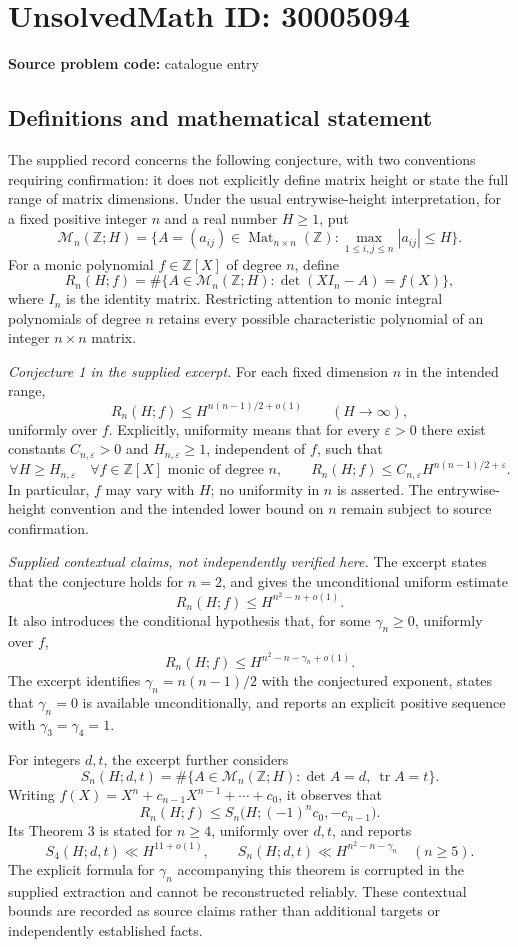 \documentclass[11pt]{article}
\newcommand{\Z}{\mathbb{Z}}
\begin{document}
\section*{UnsolvedMath ID: 30005094}
\textbf{Source problem code:} catalogue entry
\subsection{Definitions and mathematical statement}
The supplied record concerns the following conjecture, with two conventions requiring confirmation: it does not explicitly define matrix height or state the full range of matrix dimensions. Under the usual entrywise-height interpretation, for a fixed positive integer \(n\) and a real number \(H\geq 1\), put
\[
\mathcal M_n(\Z;H)=\{A=(a_{ij})\in\operatorname{Mat}_{n\times n}(\Z):\max_{1\leq i,j\leq n}|a_{ij}|\leq H\}.
\]
For a monic polynomial \(f\in\Z[X]\) of degree \(n\), define
\[
R_n(H;f)=\#\{A\in\mathcal M_n(\Z;H):\det(XI_n-A)=f(X)\},
\]
where \(I_n\) is the identity matrix. Restricting attention to monic integral polynomials of degree \(n\) retains every possible characteristic polynomial of an integer \(n\times n\) matrix.

\emph{Conjecture 1 in the supplied excerpt.} For each fixed dimension \(n\) in the intended range,
\[
R_n(H;f)\leq H^{n(n-1)/2+o(1)}\qquad(H\to\infty),
\]
uniformly over \(f\). Explicitly, uniformity means that for every \(\varepsilon>0\) there exist constants \(C_{n,\varepsilon}>0\) and \(H_{n,\varepsilon}\geq1\), independent of \(f\), such that
\[
\forall H\geq H_{n,\varepsilon}\quad
\forall f\in\Z[X]\text{ monic of degree }n,\qquad
R_n(H;f)\leq C_{n,\varepsilon}H^{n(n-1)/2+\varepsilon}.
\]
In particular, \(f\) may vary with \(H\); no uniformity in \(n\) is asserted. The entrywise-height convention and the intended lower bound on \(n\) remain subject to source confirmation.

\emph{Supplied contextual claims, not independently verified here.} The excerpt states that the conjecture holds for \(n=2\), and gives the unconditional uniform estimate
\[
R_n(H;f)\leq H^{n^2-n+o(1)}.
\]
It also introduces the conditional hypothesis that, for some \(\gamma_n\geq0\), uniformly over \(f\),
\[
R_n(H;f)\leq H^{n^2-n-\gamma_n+o(1)}.
\]
The excerpt identifies \(\gamma_n=n(n-1)/2\) with the conjectured exponent, states that \(\gamma_n=0\) is available unconditionally, and reports an explicit positive sequence with \(\gamma_3=\gamma_4=1\).

For integers \(d,t\), the excerpt further considers
\[
S_n(H;d,t)=\#\{A\in\mathcal M_n(\Z;H):\det A=d,\ \operatorname{tr}A=t\}.
\]
Writing \(f(X)=X^n+c_{n-1}X^{n-1}+\cdots+c_0\), it observes that
\[
R_n(H;f)\leq S_n\bigl(H;(-1)^nc_0,-c_{n-1}\bigr).
\]
Its Theorem 3 is stated for \(n\geq4\), uniformly over \(d,t\), and reports
\[
S_4(H;d,t)\ll H^{11+o(1)},\qquad
S_n(H;d,t)\ll H^{n^2-n-\gamma_n}\quad(n\geq5).
\]
The explicit formula for \(\gamma_n\) accompanying this theorem is corrupted in the supplied extraction and cannot be reconstructed reliably. These contextual bounds are recorded as source claims rather than additional targets or independently established facts.
\end{document}
